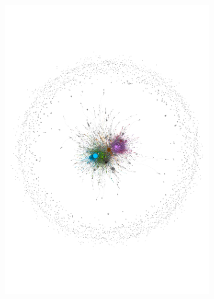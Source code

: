 \documentclass[
  a4paper,
  abstract=on,
  captions=tableabove
  ]{scrartcl}
\begin{document}
\begin{figure}
\begin{subfigure}{.45\linewidth}
          \includegraphics[width=\linewidth, height=\textheight, keepaspectratio]{img/net_hyperlocal_two.pdf}
        \end{subfigure}


\end{figure}
\end{document}
